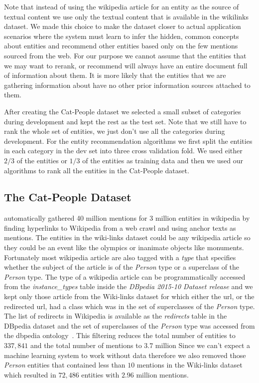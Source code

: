 \documentclass{article}
\newcommand{\newcite}[1]{\cite{#1}}
\begin{document}
Note that instead of using the wikipedia article for an entity as the
source of textual content we use only the textual content that is available in
the wikilinks dataset. We made this choice to make the dataset closer to actual
application scenarios where the system must learn to infer the hidden, common
concepts about entities and recommend other entities based only on the few
mentions sourced from the web. For our purpose we cannot assume that the
entities that we may want to rerank, or recommend will always have an entire
document full of information about them. It is more likely that the entities
that we are gathering information about have no other prior information sources
attached to them.

After creating the Cat-People dataset we selected a small subset of categories
during development and kept the rest as the test set. Note that we still have to
rank the whole set of entities, we just don't use all the categories during
development.
For the entity recommendation algorithms we first split the entities in each
category in the dev set into three cross validation
fold. We used either $2/3$ of the entities or $1/3$ of the entities as training
data and then we used our algorithms to rank all the entities in the Cat-People
dataset.

\subsection{The Cat-People Dataset}
\label{ssec:cat-people-dataset}
\newcite{singh2012wikilinks}
automatically gathered 40 million mentions for 3 million entities in wikipedia
by finding hyperlinks to Wikipedia from a web crawl and using anchor texts as
mentions. The entities in the wiki-links dataset could be any wikipedia article
so they could be an event like the olympics or inanimate objects like
monuments. Fortunately most wikipedia article are also tagged with a \textit{type}
that specifies whether the subject of the article is of the \textit{Person} type
or a superclass of the \textit{Person} type.
The type of a wikipedia article can be programmatically accessed from the \textit{instance\_types} table inside
the \textit{DBpedia 2015-10 Dataset release} and we kept only those article from the
Wiki-links dataset for which either the url, or the redirected url, had a class which was in the set of
superclasses of the \textit{Person} type.
The list of redirects in Wikipedia is available as the \textit{redirects}
table in the DBpedia dataset and the set of superclasses of the \textit{Person}
type was accessed from the dbpedia ontology~\cite{dbpedia-ontology-url}.
This filtering reduces the total number of entities to $337,841$ and the total number of mentions to $3.7$ million
Since we can't expect a machine learning system to work without data therefore
we also removed those \textit{Person} entities that contained less than $10$ mentions
in the Wiki-links dataset which resulted in $72,486$ entities with $2.96$ million mentions.
\end{document}
